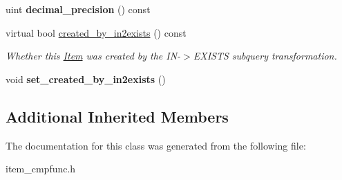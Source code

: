 \begin{DoxyCompactItemize}
\item 
\mbox{\label{classItem__bool__func_a255b4e1bdb67545adfa1dd9e8a28f00a}} 
uint {\bfseries decimal\+\_\+precision} () const
\item 
\mbox{\label{classItem__bool__func_a4d3270d14c750f06c6702bfd62f275e1}} 
virtual bool \mbox{\hyperlink{classItem__bool__func_a4d3270d14c750f06c6702bfd62f275e1}{created\+\_\+by\+\_\+in2exists}} () const
\begin{DoxyCompactList}\small\item\em Whether this \mbox{\hyperlink{classItem}{Item}} was created by the IN-\/$>$E\+X\+I\+S\+TS subquery transformation. \end{DoxyCompactList}\item 
\mbox{\label{classItem__bool__func_a4ae54c55afc7fcdc1c0aac1fd8fb7cab}} 
void {\bfseries set\+\_\+created\+\_\+by\+\_\+in2exists} ()
\end{DoxyCompactItemize}
\subsection*{Additional Inherited Members}


The documentation for this class was generated from the following file\+:\begin{DoxyCompactItemize}
\item 
item\+\_\+cmpfunc.\+h\end{DoxyCompactItemize}
